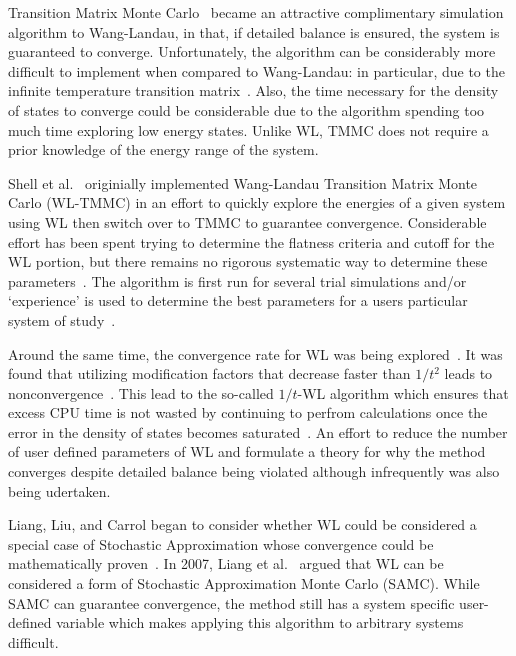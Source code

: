 \documentclass[letterpaper,twocolumn,amsmath,amssymb,pre,aps,10pt]{revtex4-1}
\begin{document}
Transition Matrix Monte Carlo~\cite{wang1999transition,
swendsen1999transition, fitzgerald2000monte} became an attractive
complimentary simulation algorithm to Wang-Landau, in that, if detailed
balance is ensured, the system is guaranteed to converge.  Unfortunately,
the algorithm can be considerably more difficult to implement when
compared to Wang-Landau: in particular, due to the infinite temperature
transition matrix~\cite{wang2002transition}.  Also, the time necessary
for the density of states to converge could be considerable
due to the algorithm spending too much time exploring low energy states.
Unlike WL, TMMC does not require a prior knowledge of the energy range of
the system.

Shell et al.~\cite{shell2003improved, shell2004flat} originially
implemented Wang-Landau Transition Matrix Monte Carlo (WL-TMMC) in an
effort to quickly explore the energies of a given system using WL then
switch over to TMMC to guarantee convergence. Considerable effort has
been spent trying to determine the flatness criteria and cutoff for the
WL portion, but there remains no rigorous systematic way to determine
these parameters~\cite{rane2013monte}.  The algorithm is first run for
several trial simulations and/or `experience' is used to determine the
best parameters for a users particular system of
study~\cite{siderius2013use}.

Around the same time, the convergence rate for WL was being
explored~\cite{zhou2005understanding,lee2006convergence,
belardinelli2007wang}. It was found that utilizing modification factors
that decrease faster than $1/t^2$ leads to
nonconvergence~\cite{belardinelli2007fast}.  This lead to the so-called
$1/t$-WL algorithm which ensures that excess CPU time is not wasted by
continuing to perfrom calculations once the error in the density of
states becomes saturated~\cite{belardinelli2008analysis}. An effort to
reduce the number of user defined parameters of WL and formulate a
theory for why the method converges despite detailed balance being
violated although infrequently was also being udertaken.

Liang, Liu, and Carrol began to consider whether WL could be considered
a special case of Stochastic Approximation whose convergence could be
mathematically proven~\cite{liang2006theory, liang2007stochastic}. In
2007, Liang et al.~\cite{liang2007stochastic} argued that WL can be
considered a form of Stochastic Approximation Monte Carlo (SAMC). While
SAMC can guarantee convergence, the method still has a system specific
user-defined variable which makes applying this algorithm to arbitrary
systems difficult.
\end{document}
